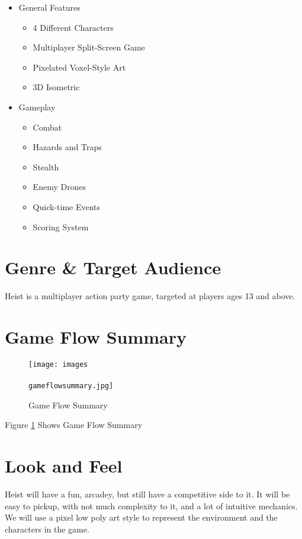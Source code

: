 \documentclass[14pt]{report}
\begin{document}
\begin{itemize}
    \item General Features
    \begin{itemize}
        \item 4 Different Characters
        \item Multiplayer Split-Screen Game
        \item Pixelated Voxel-Style Art
        \item 3D Isometric
    \end{itemize}
    \item Gameplay
    \begin{itemize}
        \item Combat
        \item Hazards and Traps
        \item Stealth
        \item Enemy Drones
        \item Quick-time Events
        \item Scoring System
    \end{itemize}
\end{itemize}

\section{Genre \& Target Audience}
Heist is a multiplayer action party game, targeted at players ages 13 and above.

\section{Game Flow Summary}

\begin{figure}
	\texttt{[image: images\\\\gameflowsummary.jpg]}
	\caption{Game Flow Summary}
	\label{fig:gameflowsummary}
\end{figure}

Figure \ref{fig:gameflowsummary} Shows Game Flow Summary

\section{Look and Feel}

Heist will have a fun, arcadey, but still have a competitive side to it. It will be easy to pickup, with not much complexity to it, and a lot of intuitive mechanics. We will use a pixel low poly art style to represent the environment and the characters in the game.
\end{document}
